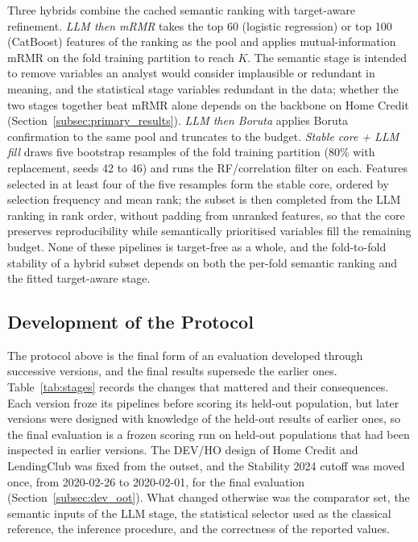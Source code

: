 \documentclass[final,5p,twocolumn]{elsarticle}
\newcommand{\Kfeat}{K}
\begin{document}
Three hybrids combine the cached semantic ranking with target-aware refinement. \emph{LLM then mRMR} takes the top 60 (logistic regression) or top 100 (CatBoost) features of the ranking as the pool and applies mutual-information mRMR on the fold training partition to reach $\Kfeat$. The semantic stage is intended to remove variables an analyst would consider implausible or redundant in meaning, and the statistical stage variables redundant in the data; whether the two stages together beat mRMR alone depends on the backbone on Home Credit (Section~\ref{subsec:primary_results}). \emph{LLM then Boruta} applies Boruta confirmation to the same pool and truncates to the budget. \emph{Stable core + LLM fill} draws five bootstrap resamples of the fold training partition (80\% with replacement, seeds 42 to 46) and runs the RF/correlation filter on each. Features selected in at least four of the five resamples form the stable core, ordered by selection frequency and mean rank; the subset is then completed from the LLM ranking in rank order, without padding from unranked features, so that the core preserves reproducibility while semantically prioritised variables fill the remaining budget. None of these pipelines is target-free as a whole, and the fold-to-fold stability of a hybrid subset depends on both the per-fold semantic ranking and the fitted target-aware stage.

\subsection{Development of the Protocol}
\label{subsec:protocol_development}

The protocol above is the final form of an evaluation developed through successive versions, and the final results supersede the earlier ones. Table~\ref{tab:stages} records the changes that mattered and their consequences. Each version froze its pipelines before scoring its held-out population, but later versions were designed with knowledge of the held-out results of earlier ones, so the final evaluation is a frozen scoring run on held-out populations that had been inspected in earlier versions. The DEV/HO design of Home Credit and LendingClub was fixed from the outset, and the Stability 2024 cutoff was moved once, from 2020-02-26 to 2020-02-01, for the final evaluation (Section~\ref{subsec:dev_oot}). What changed otherwise was the comparator set, the semantic inputs of the LLM stage, the statistical selector used as the classical reference, the inference procedure, and the correctness of the reported values.
\end{document}
